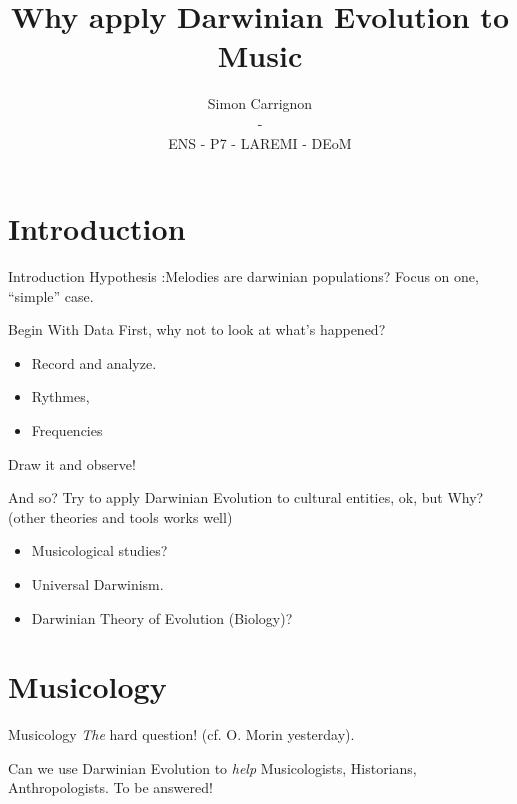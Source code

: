 \documentclass[8pt]{beamer}
\author{Simon Carrignon\\-\\ENS - P7 - LAREMI - DEoM}
\title{Why apply Darwinian Evolution to Music}
\begin{document}
\begin{frame}
	\titlepage
\end{frame}
\section{Introduction}
\begin{frame}{Introduction}
	Hypothesis :Melodies are darwinian populations?
	Focus on one, ``simple'' case.
\end{frame}

\begin{frame}{Begin With Data}
	First, why not to look at what's happened?
	\begin{itemize}
		\item Record and analyze.
		\item Rythmes,
		\item Frequencies
	\end{itemize}

	Draw it and observe!

\end{frame}

\begin{frame}{And so?}
	Try to apply Darwinian Evolution to cultural entities, ok, but Why? (other theories and tools works well)
	\vfill
	\begin{itemize}
		\item Musicological studies?
		\item Universal Darwinism.
		\item Darwinian Theory of Evolution (Biology)?
	\end{itemize}
\end{frame}


\section{Musicology}
\begin{frame}{Musicology}
	\emph{The} hard question! (cf. O. Morin yesterday). 

	Can we use Darwinian Evolution to \emph{help} Musicologists, Historians, Anthropologists. To be answered!
\end{frame}
\end{document}
